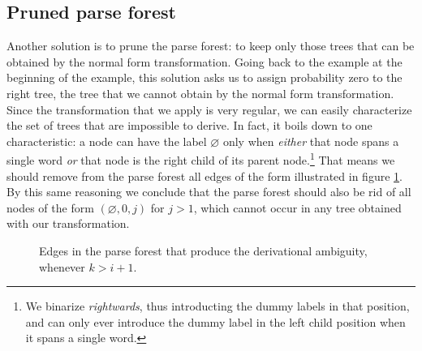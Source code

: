   \subsection{Pruned parse forest}
    Another solution is to prune the parse forest: to keep only those trees that can be obtained by the normal form transformation. Going back to the example at the beginning of the example, this solution asks us to assign probability zero to the right tree, the tree that we cannot obtain by the normal form transformation. Since the transformation that we apply is very regular, we can easily characterize the set of trees that are impossible to derive. In fact, it boils down to one characteristic: a node can have the label $\varnothing$ only when \textit{either} that node spans a single word \textit{or} that node is the right child of its parent node.\footnote{We binarize \textit{rightwards}, thus introducting the dummy labels in that position, and can only ever introduce the dummy label in the left child position when it spans a single word.} That means we should remove from the parse forest all edges of the form illustrated in figure \ref{fig:illegal-edges}. By this same reasoning we conclude that the parse forest should also be rid of all nodes of the form $(\varnothing, 0, j)$ for $j > 1$, which cannot occur in any tree obtained with our transformation.

    \begin{figure}[h]
      \center
      \begin{tikzpicture}[scale=.6]
        
      \end{tikzpicture}
      \caption{Edges in the parse forest that produce the derivational ambiguity, whenever $k > i+1$.}
      \label{fig:illegal-edges}
    \end{figure}

